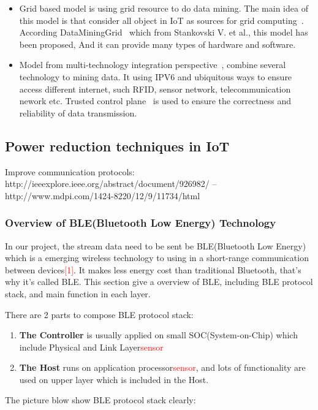 \documentclass{report}
\begin{document}
\begin{itemize}
    \item Grid based model is using grid resource to do data mining. The main idea of this model is that consider all object in IoT as sources for grid computing~\cite{bin2010research}. According DataMiningGrid~\cite{stankovski2008digging} which from Stankovski V. et al., this model has been proposed, And it can provide many types of hardware and software.
    
    \item Model from multi-technology integration perspective~\cite{bin2010research}, combine several technology to mining data. It using IPV6 and ubiquitous ways to ensure access different internet, such RFID, sensor network, telecommunication nework etc. Trusted control plane~\cite{bin2010research} is used to ensure the correctness and reliability of data transmission.
    
\end{itemize}
\subsection{Power reduction techniques in IoT}

Improve communication protocols: 
http://ieeexplore.ieee.org/abstract/document/926982/
--http://www.mdpi.com/1424-8220/12/9/11734/html
\subsubsection{Overview of BLE(Bluetooth Low Energy) Technology}
In our project, the stream data need to be sent be BLE(Bluetooth Low Energy) which is a emerging wireless technology to using in a short-range communication between devices\textcolor{red}{[1]}. It makes less energy cost than traditional Bluetooth, that's why it's called BLE. This section give a overview of BLE, including BLE protocol stack, and main function in each layer.

There are 2 parts to compose BLE protocol stack:
\begin{enumerate}
    \item \textbf{The Controller} is usually applied on small SOC(System-on-Chip) which include Physical and Link Layer\textcolor{red}{sensor}
    
    \item \textbf{The Host} runs on application processor\textcolor{red}{sensor}, and lots of functionality are used on upper layer which is included in the Host.
\end{enumerate}
The picture blow show BLE protocol stack clearly:
\end{document}
